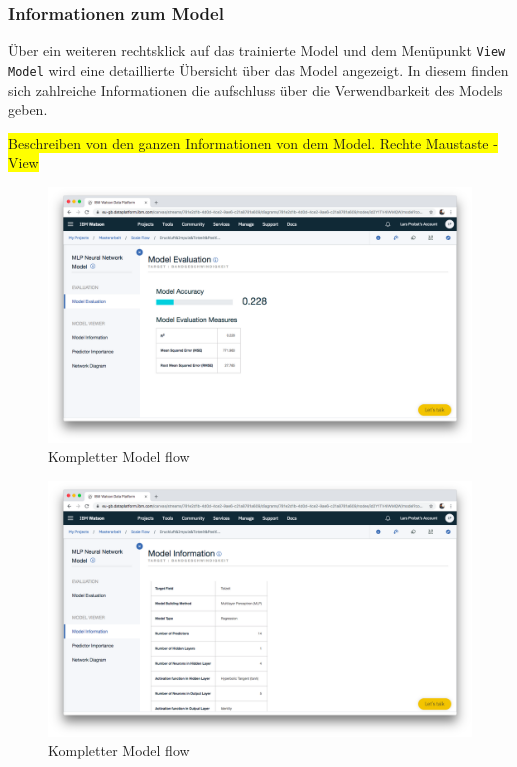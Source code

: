 \subsubsection{Informationen zum Model}
Über ein weiteren rechtsklick auf das trainierte Model und dem Menüpunkt \texttt{View Model} wird eine detaillierte
Übersicht über das Model angezeigt. In diesem finden sich zahlreiche Informationen die aufschluss über die Verwendbarkeit
des Models geben.

\colorbox{yellow}{Beschreiben von den ganzen Informationen von dem Model. Rechte Maustaste - View}

\begin{figure}[h]
    \centering
    \includegraphics[scale=0.26]{images/kapitel_3/model_evaluation.png}
    \caption{Kompletter Model flow}
    \label{fig:umsetzung_model_evaluation}
\end{figure}

\begin{figure}[h]
    \centering
    \includegraphics[scale=0.26]{images/kapitel_3/model_information.png}
    \caption{Kompletter Model flow}
    \label{fig:umsetzung_model_information}
\end{figure}

